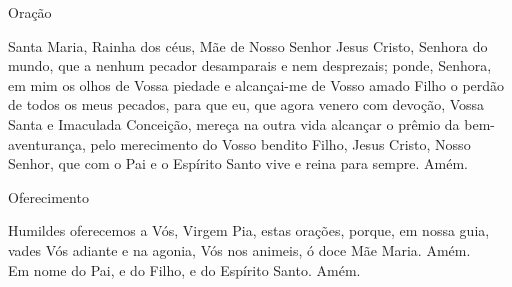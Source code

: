 \begin{center}
    \textcolor{VioletRed3}{Oração}
\end{center}
\begin{flushleft}
    Santa Maria, Rainha dos céus, Mãe de Nosso Senhor Jesus Cristo, Senhora do mundo, que a nenhum pecador desamparais e nem desprezais; ponde, Senhora, em mim os olhos de Vossa piedade e alcançai-me de Vosso amado Filho o perdão de todos os meus pecados, para que eu, que agora venero com devoção, Vossa Santa e Imaculada Conceição, mereça na outra vida alcançar o prêmio da bem-aventurança, pelo merecimento do Vosso bendito Filho, Jesus Cristo, Nosso Senhor, que com o Pai e o Espírito Santo vive e reina para sempre. Amém.
\end{flushleft}
\begin{center}
    \textcolor{VioletRed3}{Oferecimento}
\end{center}
\begin{flushleft}
    Humildes oferecemos a Vós, Virgem Pia, estas orações, porque, em nossa guia, vades Vós adiante e na agonia, Vós nos animeis, ó doce Mãe Maria. Amém.
    \vspace{.2cm} \\
    Em nome do Pai, \grecrossRed{} e do Filho, e do Espírito Santo. Amém.
\end{flushleft}
